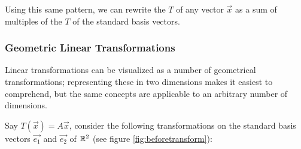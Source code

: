 \documentclass[12pt]{article}
\begin{document}
Using this same pattern, we can rewrite the $T$ of any vector $\Vec{x}$ as a sum of multiples of the $T$ of the standard basis vectors. 

\subsubsection{Geometric Linear Transformations}
Linear transformations can be visualized as a number of geometrical transformations; representing these in two dimensions makes it easiest to comprehend, but the same concepts are applicable to an arbitrary number of dimensions.

Say $T(\Vec{x}) = A\Vec{x}$, consider the following transformations on the standard basis vectors $\Vec{e_1}$ and $\Vec{e_2}$ of $\mathbb{R}^2$ (see figure \ref{fig:beforetransform}):
\end{document}

